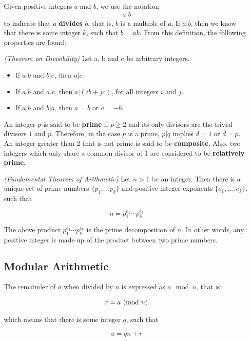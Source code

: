 Given positive integers $a$ and $b$, we use the notation 
\[
a|b
\]
to indicate that $a$ \textbf{divides} $b$, that is, $b$ is a multiple of $a$. If $a|b$, then we know that there is some integer $k$, such that $b=ak$. From this definition, the following properties are found:

\begin{theorem}
  \emph{(Theorem on Divisibility)} Let a, b and c be arbitrary integers,
  \begin{itemize}
  \item If $a|b$ and $b|c$, then $a|c$.
  \item If $a|b$ and $a|c$, then $a|(ib+jc)$, for all integers $i$ and $j$.
  \item If $a|b$ and $b|a$, then $a=b$ or $a= -b$.
  \end{itemize}
\end{theorem}

An integer $p$ is said to be \textbf{prime} if $p\geq 2$ and its only divisors are the trivial divisors $1$ and $p$. Therefore, in the case $p$ is a prime, $p|q$ implies $d=1$ or $d=p$. An integer greater than 2 that is not prime is said to be \textbf{composite}. Also, two integers which only share a common divisor of 1 are considered to be \textbf{relatively prime}.


\begin{theorem}
\emph{(Fundamental Theorem of Arithmetic)}
Let $n > 1$ be an integer. Then there is a unique set of prime numbers $\{p_{1}, \dots p_{k}\}$ and positive integer exponents  $\{e_{1}, \dots , e_{k}\}$, such that

\[
n = p_{1}^{e_{1}} \cdots p_{k}^{e_{k}}
\]
\end{theorem}

The above product $p_{1}^{e_{1}} \cdots p_{k}^{e_{k}}$ is the prime decomposition of $n$. In other words, any positive integer is made up of the product between two prime numbers.   

\subsection{Modular Arithmetic}

The remainder of $a$ when divided by $n$ is expressed as $a \mod n$, that is:

\[
  r = a \ (\text{mod}\ n)
\]

\noindent which means that there is some integer $q$, such that

\[
  a = qn + r
\]

